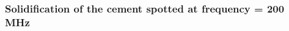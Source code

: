 \documentclass[aspectratio=169]{beamer}
\begin{document}
\begin{frame}
\frametitle{Solidification of the cement spotted at frequency = 200 MHz}


\begin{minipage}{0.49\linewidth}
\end{minipage}
\hfill
\begin{minipage}{0.49\linewidth}
\end{minipage}



\end{frame}
\end{document}
